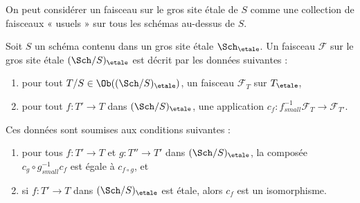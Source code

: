 \noindent
On peut considérer un faisceau sur le gros site étale de $S$ comme une collection
de faisceaux « usuels » sur tous les schémas au-dessus de $S$.

\begin{lemma}
\label{lemma-characterize-sheaf-big-etale}
Soit $S$ un schéma contenu dans un gros site étale
$\Sch_\etale$.
Un faisceau $\mathcal{F}$ sur le gros site étale
$(\Sch/S)_\etale$ est décrit par les données suivantes :
\begin{enumerate}
\item pour tout $T/S \in \Ob((\Sch/S)_\etale)$, un faisceau
$\mathcal{F}_T$ sur $T_\etale$,
\item pour tout $f : T' \to T$ dans
$(\Sch/S)_\etale$, une application
$c_f : f_{small}^{-1}\mathcal{F}_T \to \mathcal{F}_{T'}$.
\end{enumerate}
Ces données sont soumises aux conditions suivantes :
\begin{enumerate}
\item[(a)] pour tous $f : T' \to T$ et $g : T'' \to T'$ dans
$(\Sch/S)_\etale$, la composée
$c_g \circ g_{small}^{-1}c_f$ est égale à $c_{f \circ g}$, et
\item[(b)] si $f : T' \to T$ dans $(\Sch/S)_\etale$
est étale, alors $c_f$ est un isomorphisme.
\end{enumerate}
\end{lemma}


